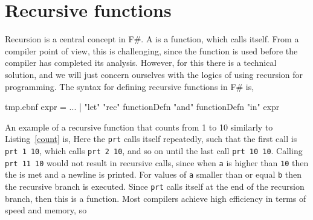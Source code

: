 

\section{Recursive functions}
Recursion is a central concept in F\#. A  is a function, which calls itself. From a compiler point of view, this is challenging, since the function is used before the compiler has completed its analysis. However, for this there is a technical solution, and we will just concern ourselves with the logics of using recursion for programming. The syntax for defining recursive functions in F\# is,
%
\begin{verbatimwrite}{tmp.ebnf}
expr = ... 
  | "let" "rec" functionDefn {"and" functionDefn} "in" expr
\end{verbatimwrite}
%
An example of a recursive function that counts from 1 to 10 similarly to Listing~\ref{count} is,
%
%
Here the \lstinline!prt! calls itself repeatedly, such that the first call is \lstinline!prt 1 10!, which calls \lstinline!prt 2 10!, and so on until the last call \lstinline!prt 10 10!. Calling \lstinline!prt 11 10! would not result in recursive calls, since when \lstinline!a! is higher than \lstinline!10! then the  is met and a newline is printed. For values of \lstinline!a! smaller than or equal \lstinline!b! then the recursive branch is executed. Since \lstinline!prt! calls itself at the end of the recursion branch, then this is a  function. Most compilers achieve high efficiency in terms of speed and memory, so 
